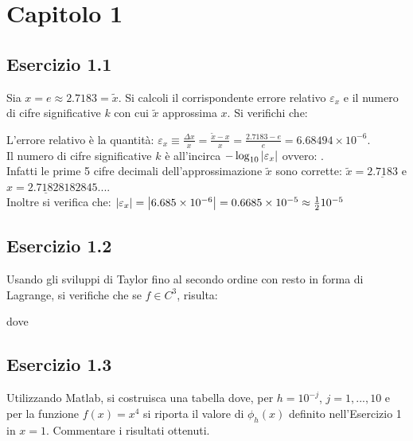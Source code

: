 \section{Capitolo 1}


	\subsection{Esercizio 1.1}

Sia $x = e \approx 2.7183 = \tilde{x}$. Si calcoli il corrispondente errore relativo $\varepsilon_x$ e il numero di cifre significative $k$ con cui $\tilde{x}$ approssima $x$. Si verifichi che:


L'errore relativo è la quantità: $\varepsilon_x \equiv \frac{\Delta{x}}{x}=\frac{\tilde{x}-x}{x} = \frac{2.7183-e}{e} = 6.68494 \times 10^{-6}$.\\
Il numero di cifre significative $k$ è all'incirca $-\log_{10}{\abs{\varepsilon_x}}$ ovvero: 
.\\
Infatti le prime 5 cifre decimali dell'approssimazione $\tilde{x}$ sono corrette: $\tilde{x}  =\underline{2.7183}$ e $x = \underline{2.71828}182845...$.\\
Inoltre si verifica che: $\abs{\varepsilon_x} = \abs{6.685 \times 10^{-6}} = 0.6685 \times 10^{-5} \approx \frac{1}{2}10^{-5}$


	\subsection{Esercizio 1.2}
	
	Usando gli sviluppi di Taylor fino al secondo ordine con resto in forma di Lagrange, si verifiche che se $f \in C^3$, risulta:
	

	dove


\TODO


	\subsection{Esercizio 1.3}
	
Utilizzando Matlab, si costruisca una tabella dove, per $h = 10^{-j}$, $j =1, . . . , 10$ e per la funzione $f(x) = x^{4}$ si riporta il valore di $\phi_h(x)$ definito nell'Esercizio 1 in $x = 1$. Commentare i risultati ottenuti.

